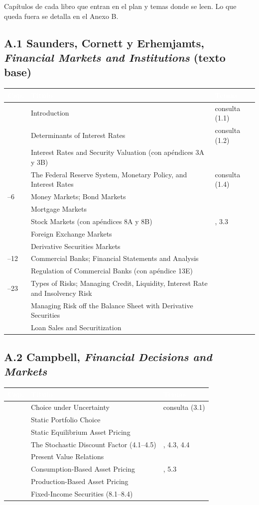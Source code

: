 \documentclass[11pt,a4paper]{article}
\newcommand{\cab}[1]{\textcolor{white}{\sffamily\bfseries #1}}
\newcommand{\filasalternas}{\rowcolors{2}{white}{mhpale}}
\begin{document}
Capítulos de cada libro que entran en el plan y temas donde se leen. Lo que
queda fuera se detalla en el Anexo B.

\newcommand{\mapa}[2]{%
\subsection*{#1}
{\small\filasalternas
\noindent\begin{tabularx}{\textwidth}{>{\raggedright\arraybackslash}p{1.1cm}X>{\raggedright\arraybackslash}p{3.8cm}}
\toprule
\rowcolor{mhnavy}\cab{Cap.} & \cab{Título} & \cab{Temas} \\
\midrule
#2
\bottomrule
\end{tabularx}
}}

\mapa{A.1 Saunders, Cornett y Erhemjamts, \emph{Financial Markets and Institutions} (texto base)}{%
1 & Introduction & consulta (1.1) \\
2 & Determinants of Interest Rates & consulta (1.2) \\
3 & Interest Rates and Security Valuation (con apéndices 3A y 3B) & 1.3 \\
4 & The Federal Reserve System, Monetary Policy, and Interest Rates & consulta (1.4) \\
5--6 & Money Markets; Bond Markets & 2.1 \\
7 & Mortgage Markets & 2.3 \\
8 & Stock Markets (con apéndices 8A y 8B) & 2.2, 3.3 \\
9 & Foreign Exchange Markets & 8.1 \\
10 & Derivative Securities Markets & 2.4 \\
11--12 & Commercial Banks; Financial Statements and Analysis & 6.2 \\
13 & Regulation of Commercial Banks (con apéndice 13E) & 7.1 \\
20--23 & Types of Risks; Managing Credit, Liquidity, Interest Rate and Insolvency Risk & 6.3 \\
24 & Managing Risk off the Balance Sheet with Derivative Securities & 2.4 \\
25 & Loan Sales and Securitization & 2.3 \\
}

\mapa{A.2 Campbell, \emph{Financial Decisions and Markets}}{%
1 & Choice under Uncertainty & consulta (3.1) \\
2 & Static Portfolio Choice & 3.2 \\
3 & Static Equilibrium Asset Pricing & 3.3 \\
4 & The Stochastic Discount Factor (4.1--4.5) & 4.2, 4.3, 4.4 \\
5 & Present Value Relations & 5.1 \\
6 & Consumption-Based Asset Pricing & 5.2, 5.3 \\
7 & Production-Based Asset Pricing & 5.4 \\
8 & Fixed-Income Securities (8.1--8.4) & 5.5 \\
}
\end{document}
